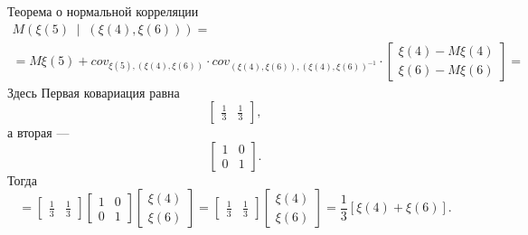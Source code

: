 \begin{enumerate}[label=\alph*)]
  Теорема о нормальной корреляции
  \begin{gather*}
    M \left(
      \xi \left( 5 \right) \; \middle| \; \left( \xi \left( 4 \right), \xi \left( 6 \right) \right)
    \right) = \\
    = M \xi \left( 5 \right) +
    cov_{ \xi \left(5 \right), \left( \xi \left( 4 \right), \xi \left( 6 \right) \right) } \cdot
    cov_{\left(\xi\left(4\right),\xi\left(6\right)\right),\left(\xi\left(4\right),\xi\left(6\right)\right)^{-1}} \cdot
    \begin{bmatrix}
      \xi \left( 4 \right) - M \xi \left( 4 \right) \\
      \xi \left( 6 \right) - M \xi \left( 6 \right)
    \end{bmatrix} =
  \end{gather*}
  Здесь
  Первая ковариация равна
  $$ \begin{bmatrix}
    \frac{1}{3} & \frac{1}{3}
  \end{bmatrix},$$
  а вторая ---
  $$ \begin{bmatrix}
    1 & 0 \\
    0 & 1
  \end{bmatrix}.$$
  Тогда
  $$= \begin{bmatrix}
    \frac{1}{3} & \frac{1}{3}
  \end{bmatrix}
  \begin{bmatrix}
    1 & 0 \\
    0 & 1
  \end{bmatrix}
  \begin{bmatrix}
    \xi \left( 4 \right) \\
    \xi \left( 6 \right)
  \end{bmatrix} =
  \begin{bmatrix}
    \frac{1}{3} & \frac{1}{3}
  \end{bmatrix}
  \begin{bmatrix}
    \xi \left( 4 \right) \\
    \xi \left( 6 \right)
  \end{bmatrix} =
  \frac{1}{3} \left[ \xi \left( 4 \right) + \xi \left( 6 \right) \right].$$
\end{enumerate}
